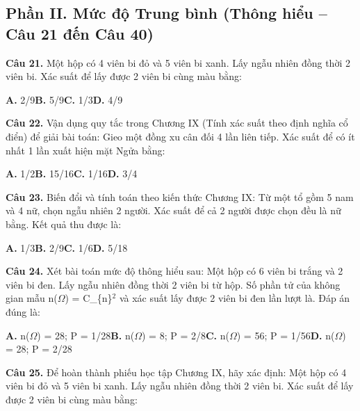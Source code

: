 \documentclass[11pt,a4paper]{article}
\begin{document}
\subsection*{\color{accent} Phần II. Mức độ Trung bình (Thông hiểu -- Câu 21 đến Câu 40)}
\textbf{\color{primary} Câu 21.} Một hộp có 4 viên bi đỏ và 5 viên bi xanh. Lấy ngẫu nhiên đồng thời 2 viên bi. Xác suất để lấy được 2 viên bi cùng màu bằng:\par
\hspace*{1.5em}\textbf{A.} 2/9\quad\quad \textbf{B.} 5/9\quad\quad \textbf{C.} 1/3\quad\quad \textbf{D.} 4/9\par\vspace{2pt}
\textbf{\color{primary} Câu 22.} Vận dụng quy tắc trong Chương IX (Tính xác suất theo định nghĩa cổ điển) để giải bài toán: Gieo một đồng xu cân đối 4 lần liên tiếp. Xác suất để có ít nhất 1 lần xuất hiện mặt Ngửa bằng:\par
\hspace*{1.5em}\textbf{A.} 1/2\quad\quad \textbf{B.} 15/16\quad\quad \textbf{C.} 1/16\quad\quad \textbf{D.} 3/4\par\vspace{2pt}
\textbf{\color{primary} Câu 23.} Biến đổi và tính toán theo kiến thức Chương IX: Từ một tổ gồm 5 nam và 4 nữ, chọn ngẫu nhiên 2 người. Xác suất để cả 2 người được chọn đều là nữ bằng. Kết quả thu được là:\par
\hspace*{1.5em}\textbf{A.} 1/3\quad\quad \textbf{B.} 2/9\quad\quad \textbf{C.} 1/6\quad\quad \textbf{D.} 5/18\par\vspace{2pt}
\textbf{\color{primary} Câu 24.} Xét bài toán mức độ thông hiểu sau: Một hộp có 6 viên bi trắng và 2 viên bi đen. Lấy ngẫu nhiên đồng thời 2 viên bi từ hộp. Số phần tử của không gian mẫu n($\Omega$) = C\_\{n\}$^{2}$ và xác suất lấy được 2 viên bi đen lần lượt là. Đáp án đúng là:\par
\hspace*{1.5em}\textbf{A.} n($\Omega$) = 28; P = 1/28\quad\quad \textbf{B.} n($\Omega$) = 8; P = 2/8\quad\quad \textbf{C.} n($\Omega$) = 56; P = 1/56\quad\quad \textbf{D.} n($\Omega$) = 28; P = 2/28\par\vspace{2pt}
\textbf{\color{primary} Câu 25.} Để hoàn thành phiếu học tập Chương IX, hãy xác định: Một hộp có 4 viên bi đỏ và 5 viên bi xanh. Lấy ngẫu nhiên đồng thời 2 viên bi. Xác suất để lấy được 2 viên bi cùng màu bằng:\par
\end{document}
